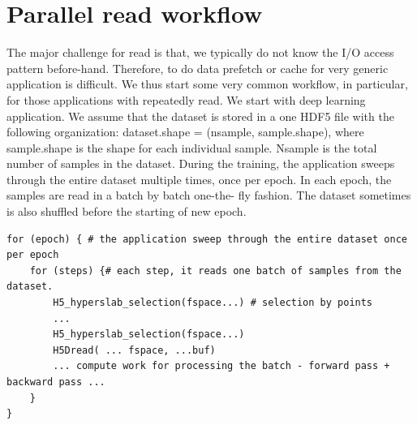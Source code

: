 \documentclass[aps, rmp, 11pt, notitlepage]{revtex4-1}
\begin{document}
\section{Parallel read workflow}
The major challenge for read is that, we typically do not know the I/O access pattern before-hand. Therefore, to do data prefetch or cache for very generic application is difficult. We thus start some very common workflow, in particular, for those applications with repeatedly read. We start with deep learning application.
We assume that the dataset is stored in a one HDF5 file with the following organization: dataset.shape = (nsample, sample.shape), where sample.shape is the shape for each individual sample. Nsample is the total number of samples in the dataset. During the training, the application sweeps through the entire dataset multiple times, once per epoch. In each epoch, the samples are read in a batch by batch one-the- fly fashion. The dataset sometimes is also shuffled before the starting of new epoch.
\begin{lstlisting}
for (epoch) { # the application sweep through the entire dataset once per epoch
	for (steps) {# each step, it reads one batch of samples from the dataset. 
		H5_hyperslab_selection(fspace...) # selection by points 
		...
		H5_hyperslab_selection(fspace...)
		H5Dread( ... fspace, ...buf)
		... compute work for processing the batch - forward pass + backward pass ... 
	}
}
\end{lstlisting}
\end{document}

